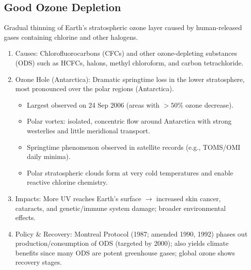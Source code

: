 \documentclass[12pt, a4paper]{article}
\begin{document}
\begin{multicols*}{3}
\subsection{Good Ozone Depletion}
Gradual thinning of Earth’s stratospheric ozone layer caused by human-released gases containing chlorine and other halogens.
\begin{enumerate}[\roman*.]
  \item {Causes:} Chlorofluorocarbons (CFCs) and other ozone-depleting substances (ODS) such as HCFCs, halons, methyl chloroform, and carbon tetrachloride.
  \item {Ozone Hole (Antarctica):} Dramatic springtime loss in the lower stratosphere, most pronounced over the polar regions (Antarctica).
    \begin{itemize}[leftmargin=*]\vspace{2pt}
      \item Largest observed on 24 Sep 2006 (areas with $>\!50\%$ ozone decrease).
      \item Polar vortex: isolated, concentric flow around Antarctica with strong westerlies and little meridional transport.
      \item Springtime phenomenon observed in satellite records (e.g., TOMS/OMI daily minima).
      \item Polar stratospheric clouds form at very cold temperatures and enable reactive chlorine chemistry.
    \end{itemize}
  \item {Impacts:} More UV reaches Earth’s surface $\rightarrow$ increased skin cancer, cataracts, and genetic/immune system damage; broader environmental effects.
  \item {Policy \& Recovery:} Montreal Protocol (1987; amended 1990, 1992) phases out production/consumption of ODS (targeted by 2000); also yields climate benefits since many ODS are potent greenhouse gases; global ozone shows recovery stages.
\end{enumerate}

\colbreak

\end{multicols*}
\end{document}
